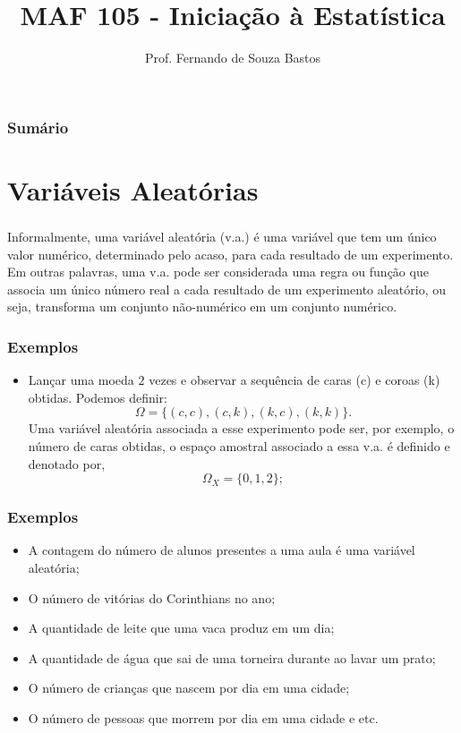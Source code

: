 \documentclass[14pt,aspectratio=1610]{beamer}
\title{MAF 105 - Iniciação à Estatística}
\author{Prof. Fernando de Souza Bastos}
\institute{Instituto de Ciências Exatas e Tecnológicas\texorpdfstring{\\ Universidade Federal de Viçosa}{}\texorpdfstring{\\ Campus UFV - Florestal}{}}
\date[\today]{}
\begin{document}


\frame{\titlepage}

\begin{frame}{}
\frametitle{\bf Sumário}
\tableofcontents
\end{frame}

\section{Variáveis Aleatórias}
\begin{frame}{}
\frametitle{}
\begin{block}{}
\justifying
Informalmente, uma variável aleatória (v.a.) é uma variável que tem um único valor numérico, determinado pelo acaso, para cada resultado de um experimento. Em outras 
palavras, uma v.a. pode ser considerada uma regra ou função que associa um único número real a cada resultado de um experimento aleatório, ou seja, transforma um 
conjunto não-numérico em um conjunto numérico.
\end{block}
\end{frame}

\begin{frame}{}
\frametitle{Exemplos}
\begin{block}{}
\justifying
\begin{itemize}
\item Lançar uma moeda $2$ vezes e observar a sequência de caras (c) e coroas (k) obtidas. Podemos definir: $$\Omega=\{(c,c),(c,k),(k,c),(k,k)\}.$$ Uma variável aleatória associada a esse experimento pode ser, por exem\-plo, o número de caras obtidas, o espaço amostral associado a essa v.a. é definido e denotado por, $$\Omega_{X}=\{0,1,2\};$$
\end{itemize}
\end{block}
\end{frame}

\begin{frame}{}
\frametitle{Exemplos}
\begin{block}{}
\justifying
\begin{itemize}
\item A contagem do número de alunos presentes a uma aula é uma variável aleatória;\pause
\item O número de vitórias do Corinthians no ano;\pause
\item A quantidade de leite que uma vaca produz em um dia;\pause
\item A quantidade de água que sai de uma torneira durante ao lavar um prato;\pause
\item O número de crianças que nascem por dia em uma cidade;\pause
\item O número de pessoas que morrem por dia em uma cidade e etc.
\end{itemize}
\end{block}
\end{frame}
\end{document}
